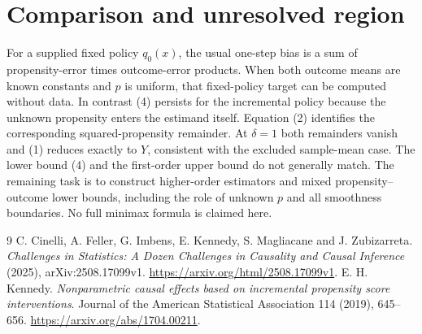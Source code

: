 \documentclass[11pt]{article}
\theoremstyle{definition}
\begin{document}
\section*{Comparison and unresolved region}
For a supplied fixed policy $q_0(x)$, the usual one-step bias is a sum of
propensity-error times outcome-error products. When both outcome means
are known constants and $p$ is uniform, that fixed-policy target can be
computed without data. In contrast (4) persists for the incremental
policy because the unknown propensity enters the estimand itself.
Equation (2) identifies the corresponding squared-propensity remainder.
At $\delta=1$ both remainders vanish and (1) reduces exactly to $Y$,
consistent with the excluded sample-mean case.
The lower bound (4) and the first-order upper bound do not generally match.
The remaining task is to construct higher-order estimators and mixed
propensity--outcome lower bounds, including the role of unknown $p$ and
all smoothness boundaries. No full minimax formula is claimed here.

\begin{thebibliography}{9}
 C. Cinelli, A. Feller, G. Imbens, E. Kennedy, S. Magliacane and J. Zubizarreta.
\emph{Challenges in Statistics: A Dozen Challenges in Causality and Causal Inference} (2025), arXiv:2508.17099v1.
\url{https://arxiv.org/html/2508.17099v1}.
 E. H. Kennedy.
\emph{Nonparametric causal effects based on incremental propensity score interventions}.
Journal of the American Statistical Association 114 (2019), 645--656.
\url{https://arxiv.org/abs/1704.00211}.
\end{thebibliography}
\end{document}
